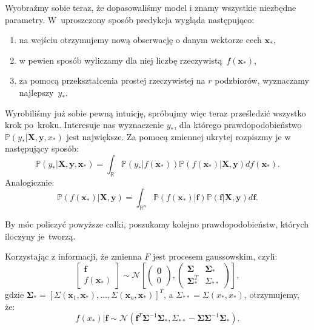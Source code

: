 \documentclass{mini}
\begin{document}
Wyobraźmy sobie teraz, że dopasowaliśmy model i znamy wszystkie niezbędne parametry. W~uproszczony sposób predykcja wygląda następująco: 
\begin{enumerate}
\item na wejściu otrzymujemy nową obserwację o danym wektorze cech $\textbf{x}_{\ast}$,
\item w pewien sposób wyliczamy dla niej liczbę rzeczywistą~$f(\mathbf{x}_{\ast})$,
\item  za pomocą przekształcenia prostej rzeczywistej na $r$ podzbiorów, wyznaczamy najlepszy~$y_{\ast}$.
\end{enumerate}

Wyrobiliśmy już sobie pewną intuicję, spróbujmy więc teraz prześledzić wszystko krok po~kroku. Interesuje nas wyznaczenie $y_{\ast}$, dla którego prawdopodobieństwo $\mathbb{P}(y_{\ast} | \textbf{X}, \textbf{y}, x_{\ast})$ jest największe. Za pomocą zmiennej ukrytej rozpiszmy je w następujący sposób:
\begin{equation}\label{calka1}
\mathbb{P}(y_{\ast} | \textbf{X}, \textbf{y}, \mathbf{x}_{\ast}) = \int_{\mathbb{R}} \mathbb{P}(y_{\ast} | f(\mathbf{x}_{\ast}))\mathbb{P}(f(\mathbf{x}_{\ast}) | \textbf{X}, \textbf{y}) df(\mathbf{x}_{\ast}).
\end{equation}
Analogicznie:
\begin{equation}\label{calka2}
\mathbb{P}(f(\mathbf{x}_{\ast}) | \textbf{X}, \textbf{y}) = \int_{\mathbb{R}^n} \mathbb{P}(f(\mathbf{x}_{\ast}) | \mathbf{f})\mathbb{P}(\mathbf{f} | \textbf{X}, \textbf{y}) d\mathbf{f}.
\end{equation}

By móc policzyć powyższe całki, poszukamy kolejno prawdopodobieństw, których iloczyny je~tworzą.

Korzystając z informacji, że zmienna $F$ jest procesem gaussowskim, czyli:
$$
\left[
	\begin{array}{c}
		\mathbf{f}\\
		f(\mathbf{x}_{\ast})
	\end{array}
\right] \sim \mathcal{N}
\left[
\left(
	\begin{array}{c}
		\mathbf{0}\\
		0
	\end{array}
\right)
,
\left(
	\begin{array}{cc}
		\mathbf{\Sigma} & \mathbf{\Sigma}_{\ast}\\
		\mathbf{\Sigma}_{\ast}^T & \Sigma_{\ast\ast}
	\end{array}
\right)
\right],
$$ 
gdzie $\mathbf{\Sigma}_{\ast} = [\Sigma(\mathbf{x}_1, \mathbf{x}_{\ast}), \ldots, \Sigma(\mathbf{x}_n, \mathbf{x}_{\ast})]^T$, a $\Sigma_{\ast\ast} = \Sigma(x_{\ast}, x_{\ast})$, otrzymujemy, że: 
\begin{equation}\label{calka21}
f(x_{\ast}) | \mathbf{f} \sim \mathcal{N}(\mathbf{f}^T\mathbf{\Sigma}^{-1}\mathbf{\Sigma}_{\ast}, \Sigma_{\ast\ast} - \mathbf{\Sigma}\mathbf{\Sigma}^{-1}\mathbf{\Sigma}_{\ast} ).
\end{equation}
\end{document}
